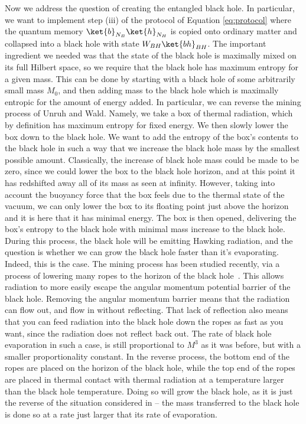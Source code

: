 \documentclass[11pt,a4paper]{article}
\begin{document}
Now we address the question of creating the entangled black hole. In particular, we want to implement step (iii) of the protocol of Equation \eqref{eq:protocol} where the quantum memory $\ket{b}_{N_{B}}\ket{h}_{N_{H}}$ is copied onto ordinary matter and collapsed into a black hole with state $W_{BH}\ket{bh}_{BH}$.
The important ingredient we needed was that the state of the black hole is maximally mixed on its full Hilbert space, so we require that the black hole has maximum entropy for a given mass. This can be done
by starting with a black hole of some arbitrarily small mass $M_0$, and then adding mass to the black hole which is maximally entropic for the amount of energy added. In particular, we can reverse the mining process 
 of Unruh and Wald\cite{unruh1982acceleration,unruh1983mine}. 
Namely, we take a box of thermal radiation, which by definition has maximum entropy for fixed energy.   We then slowly lower the box down to the black hole. We want to add the entropy of the box's contents to the black hole in such a way that we increase the black hole mass by the smallest possible amount. Classically, the increase of black hole mass could be made to be zero, since we could lower the box to the black hole horizon, and at this point it has redshifted away all of its mass as seen at infinity. However, taking into account the buoyancy force that the box feels due to the thermal state of the vacuum, we can only lower the box to its floating point just above the horizon and it is here that it has minimal energy. The box is then opened, delivering the box's entropy to the black hole with minimal mass increase to the black hole. 
During this process, the black hole will be emitting Hawking radiation, and the question is whether we can grow the black hole faster than it's evaporating. Indeed, this is the case.
The mining process has been studied recently, via a process of lowering many ropes to the horizon of the black hole~\cite{brown2012tensile}. This allows radiation to more easily escape the angular momentum potential barrier of the black hole. Removing the
angular momentum barrier means that the radiation can flow out, and flow in
without reflecting. That lack of reflection also means that you can feed  radiation into the
black hole down the ropes as fast as you want, since the radiation
does not reflect back out. The rate of black hole evaporation in such a case, is still proportional to $M^3$ as it was before, but with a smaller proportionality constant. In the reverse process, the bottom end of the ropes are placed on the horizon of the black hole, while the top end of the ropes are placed in thermal contact with thermal radiation at a temperature larger than the black hole temperature. Doing so will grow the black hole, as it is just the reverse of the situation considered in \cite{brown2012tensile} -- the mass transferred to the black hole is done so at a rate just larger that its rate of evaporation.
\end{document}
